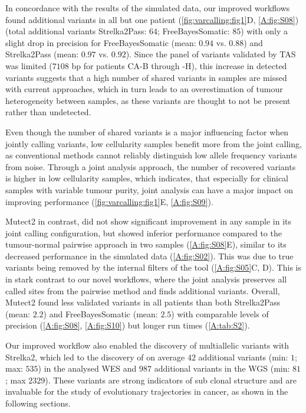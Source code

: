 In concordance with the results of the simulated data, our improved workflows found additional variants in all but one patient (\autoref{fig:varcalling:fig1}D, \autoref{A:fig:S08}) (total additional variants Strelka2Pass: $64$; FreeBayesSomatic: $85$) with only a slight drop in precision for FreeBayesSomatic (mean: $0.94$ vs. $0.88$) and Strelka2Pass (mean: $0.97$ vs. $0.92$). Since the panel of variants validated by TAS was limited ($7108$ bp for patients CA-B through -H), this increase in detected variants suggests that a high number of shared variants in samples are missed with current approaches, which in turn leads to an overestimation of tumour heterogeneity between samples, as these variants are thought to not be present rather than undetected.

Even though the number of shared variants is a major influencing factor when jointly calling variants, low cellularity samples benefit more from the joint calling, as conventional methods cannot reliably distinguish low allele frequency variants from noise. Through a joint analysis approach, the number of recovered variants is higher in low cellularity samples, which indicates, that especially for clinical samples with variable tumour purity, joint analysis can have a major impact on improving performance (\autoref{fig:varcalling:fig1}E, \autoref{A:fig:S09}).

Mutect2 in contrast, did not show significant improvement in any sample in its joint calling configuration, but showed inferior performance compared to the tumour-normal pairwise approach in two samples (\autoref{A:fig:S08}E), similar to its decreased performance in the simulated data (\autoref{A:fig:S02}). This was due to true variants being removed by the internal filters of the tool (\autoref{A:fig:S05}C, D). This is in stark contrast to our novel workflows, where the joint analysis preserves all called sites from the pairwise method and finds additional variants. Overall, Mutect2 found less validated variants in all patients than both Strelka2Pass (mean: $2.2$) and FreeBayesSomatic (mean: $2.5$) with comparable levels of precision (\autoref{A:fig:S08}, \autoref{A:fig:S10}) but longer run times (\autoref{A:tab:S2}).

Our improved workflow also enabled the discovery of multiallelic variants with Strelka2, which led to the discovery of on average $42$ additional variants (min: $1$; max: $535$) in the analysed WES and $987$ additional variants in the WGS (min: $81$; max $2329$). These variants are strong indicators of sub clonal structure and are invaluable for the study of evolutionary trajectories in cancer, as shown in the following sections.


